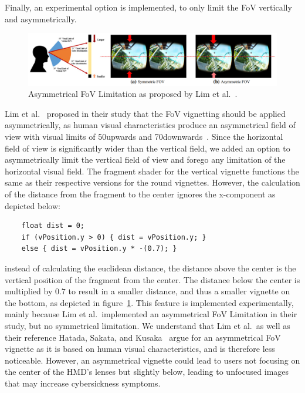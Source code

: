 Finally, an experimental option is implemented, to only limit the FoV vertically and asymmetrically.
\begin{figure}[h]
    \centering
    \includegraphics[width=\textwidth]{content/4_2_fovVignette/img/Asymmetrical_Vignette[Lim2020]}
    \caption{Asymmetrical FoV Limitation as proposed by Lim et al.~\cite{Lim2020}.}
    \label{fig:fov-assymetrical-vignette}
\end{figure}
Lim et al.~\cite{Lim2020} proposed in their study that the FoV vignetting should be applied asymmetrically, as human
visual characteristics produce an asymmetrical field of view with visual limits of 50\textdegree upwards and
70\textdegree downwards~\cite{Hatada1980}.
Since the horizontal field of view is significantly wider than the vertical field, we added an option to asymmetrically
limit the vertical field of view and forego any limitation of the horizontal visual field.
The fragment shader for the vertical vignette functions the same as their respective versions for the round
vignettes.
However, the calculation of the distance from the fragment to the center ignores the x-component as depicted below:
\begin{verbatim}
    float dist = 0;
    if (vPosition.y > 0) { dist = vPosition.y; }
    else { dist = vPosition.y * -(0.7); }
\end{verbatim}
instead of calculating the euclidean distance, the distance above the center is the vertical position of the fragment
from the center.
The distance below the center is multiplied by $0.7$ to result in a smaller distance, and thus a smaller vignette on
the bottom, as depicted in figure~\ref{fig:fov-assymetrical-vignette}.
This feature is implemented experimentally, mainly because Lim et al.\ implemented an asymmetrical FoV Limitation in
their study, but no symmetrical limitation.
We understand that Lim et al.\ as well as their reference Hatada, Sakata, and Kusaka~\cite{Hatada1980} argue for an
asymmetrical FoV vignette as it is based on human visual characteristics, and is therefore less noticeable.
However, an asymmetrical vignette could lead to users not focusing on the center of the HMD's lenses but slightly
below, leading to unfocused images that may increase cybersickness symptoms.
